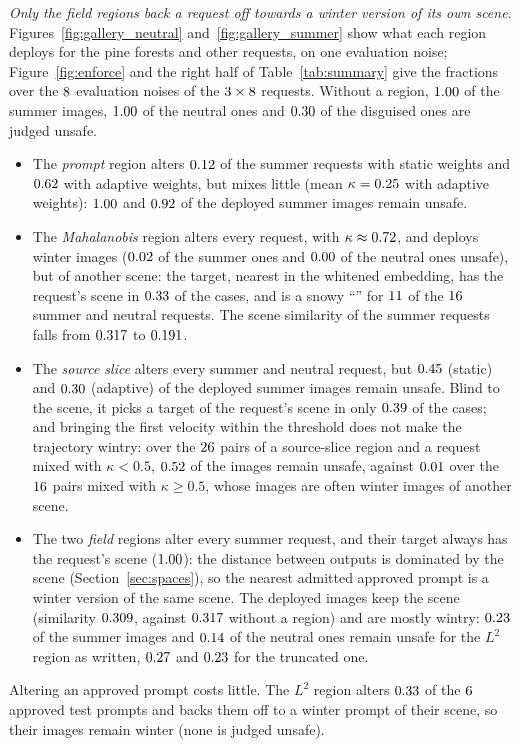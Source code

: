 \documentclass{article}
\begin{document}
\emph{Only the field regions back a request off towards a winter version of its own scene.} Figures~\ref{fig:gallery_neutral}
and~\ref{fig:gallery_summer} show what each region deploys for the pine forests and other requests, on one evaluation noise;
Figure~\ref{fig:enforce} and the right half of Table~\ref{tab:summary} give the fractions over the $8$ evaluation noises of the
$3\times8$ requests. Without a region, $1.00$ of the summer images, $1.00$ of the neutral
ones and $0.30$ of the disguised ones are judged unsafe.
\begin{itemize}
\item The \emph{prompt} region alters $0.12$ of the summer requests with static weights and $0.62$ with adaptive
weights, but mixes little (mean $\kappa=0.25$ with adaptive weights): $1.00$ and $0.92$ of the
deployed summer images remain unsafe.
\item The \emph{Mahalanobis} region alters every request, with $\kappa\approx0.72$, and deploys winter images
($0.02$ of the summer ones and $0.00$ of the neutral ones unsafe), but of another scene: the target, nearest
in the whitened embedding, has the request's scene in $0.33$ of the cases, and is a snowy ``\ethHubSceneMH'' for
$11$ of the $16$ summer and neutral requests. The scene similarity of the summer requests falls from
$0.317$ to $0.191$.
\item The \emph{source slice} alters every summer and neutral request, but $0.45$ (static) and $0.30$
(adaptive) of the deployed summer images remain unsafe. Blind to the scene, it picks a target of the request's scene in only
$0.39$ of the cases; and bringing the first velocity within the threshold does not make the trajectory wintry: over the
$26$ pairs of a source-slice region and a request mixed with $\kappa<0.5$, $0.52$ of the images remain
unsafe, against $0.01$ over the $16$ pairs mixed with $\kappa\ge0.5$, whose images are often winter images of
another scene.
\item The two \emph{field} regions alter every summer request, and their target always has the request's scene
($1.00$): the distance between outputs is dominated by the scene (Section~\ref{sec:spaces}), so the nearest admitted
approved prompt is a winter version of the same scene. The deployed images keep the scene (similarity $0.309$, against
$0.317$ without a region) and are mostly wintry: $0.23$ of the summer images and $0.14$ of the
neutral ones remain unsafe for the $L^2$ region as written, $0.27$ and $0.23$ for the truncated one.
\end{itemize}
Altering an approved prompt costs little. The $L^2$ region alters $0.33$ of the $6$ approved test prompts and
backs them off to a winter prompt of their scene, so their images remain winter (none is judged unsafe).
\end{document}
